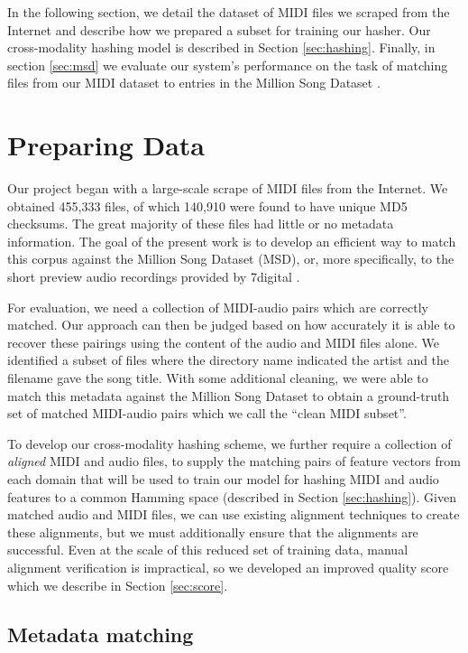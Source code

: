 \documentclass{article}
\begin{document}
In the following section, we detail the dataset of MIDI files we scraped from the Internet and describe how we prepared a subset for training our hasher.
Our cross-modality hashing model is described in Section \ref{sec:hashing}.
Finally, in section \ref{sec:msd} we evaluate our system's performance on the task of matching files from our MIDI dataset to entries in the Million Song Dataset \cite{bertin2011million}.

\section{Preparing Data}
\label{sec:dataset}

Our project began with a large-scale scrape of MIDI files from the Internet.
We obtained 455,333 files, of which 140,910 were found to have unique MD5 checksums.
The great majority of these files had little or no metadata information.
The goal of the present work is to develop an efficient way to match this corpus against the Million Song Dataset (MSD), or, more specifically, to the short preview audio recordings provided by 7digital \cite{schindler2012facilitating}.

For evaluation, we need a collection of MIDI-audio pairs which are correctly matched.
Our approach can then be judged based on how accurately it is able to recover these pairings using the content of the audio and MIDI files alone.
We identified a subset of files where the directory name indicated the artist and the filename gave the song title.
With some additional cleaning, we were able to match this metadata against the Million Song Dataset to obtain a ground-truth set of matched MIDI-audio pairs which we call the ``clean MIDI subset''.

To develop our cross-modality hashing scheme, we further require a collection of {\em aligned} MIDI and audio files, to supply the matching pairs of feature vectors from each domain that will be used to train our model for hashing MIDI and audio features to a common Hamming space (described in Section \ref{sec:hashing}).
Given matched audio and MIDI files, we can use existing alignment techniques to create these alignments, but we must additionally ensure that the alignments are successful.
Even at the scale of this reduced set of training data, manual alignment verification is impractical, so we developed an improved quality score which we describe in Section \ref{sec:score}.

\subsection{Metadata matching}
\end{document}
